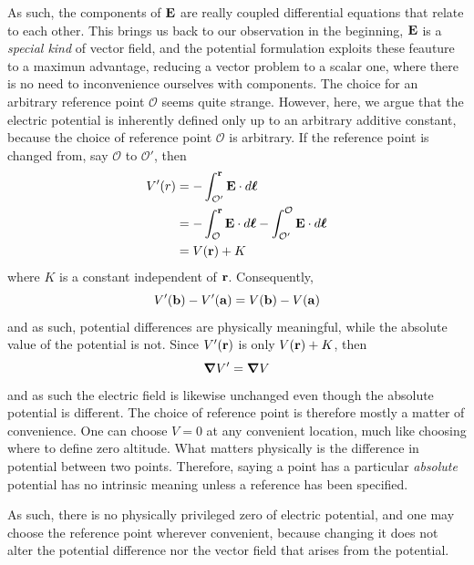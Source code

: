 			As such, the components of $\vb E$ are really coupled differential equations that relate to each other.
			This brings us back to our observation in the beginning, $\vb E$ is a \textit{special kind} of vector field,
			and the potential formulation exploits these feauture to a maximun advantage, reducing a vector problem to
			a scalar one, where there is no need to inconvenience ourselves with components.
			The choice for an arbitrary reference point $\mathcal{O}$ seems quite strange. However, here,
			we argue that the electric potential is inherently defined only up to an arbitrary additive constant,
			because the choice of reference point $\mathcal O$ is arbitrary. If the reference point is changed from, say
			$\mathcal O$ to $\mathcal{O}'$, then
			\begin{align*}
				V'(r) 
				&= -\int_{\mathcal{O}'}^{\vb r} \vb{E} \cdot \dd{\vb*{\ell}}\\
				&= -\int_{\mathcal{O}}^{\vb r} \vb{E} \cdot \dd{\vb*{\ell}}
				   -\int_{\mathcal{O}'}^{\mathcal{O}} \vb{E} \cdot \dd{\vb*{\ell}}\\
				&= V(\vb r) + K
			\end{align*}
			where $K$ is a constant independent of $\vb r$. Consequently, 
			\[
				V'(\vb b) - V'(\vb a) = V(\vb b) - V(\vb a)
			\]
			and as such, potential differences are physically meaningful, while the absolute 
			value of the potential is not. Since $V'(\vb r)$ is only $V(\vb r)+K$, then
			\[
				\grad V' = \grad V
			\]
			and as such the electric field is likewise unchanged even though the absolute potential
			is different. The choice of reference point is therefore mostly a matter of convenience.
			One can choose $V=0$ at any convenient location, much like choosing where to define zero
			altitude. What matters physically is the difference in potential between two points. Therefore,
			saying a point has a particular \textit{absolute} potential has no intrinsic meaning unless
			a reference has been specified.
			
			As such, there is no physically privileged zero of electric potential, and one may
			choose the reference point wherever convenient, because changing it does not alter
			the potential difference nor the vector field that arises from the potential.

